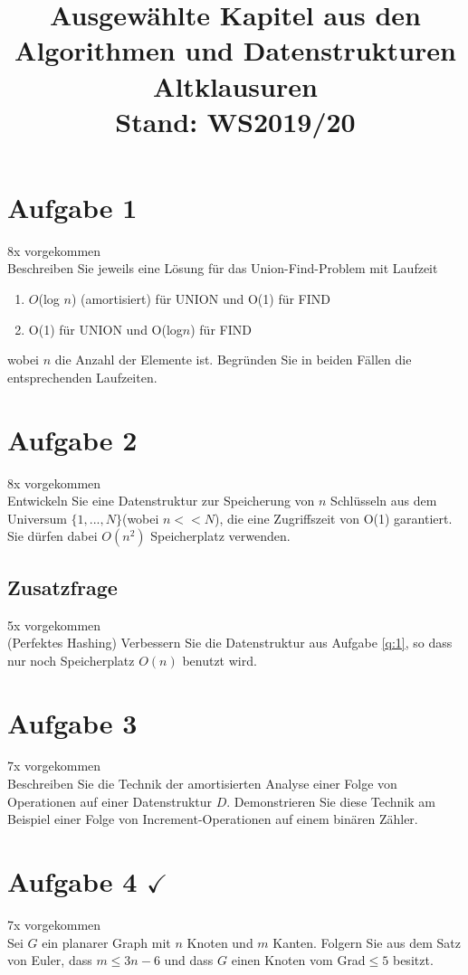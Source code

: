 \documentclass[10pt,a4paper]{article}
\author{}
\date{}
\title{{\Huge \textbf{Ausgewählte Kapitel aus den Algorithmen und Datenstrukturen Altklausuren}} \\ Stand: WS2019/20}
\begin{document}
	\maketitle
	
\section*{Aufgabe 1} 
	8x vorgekommen \\
	Beschreiben Sie jeweils eine Lösung für das Union-Find-Problem mit Laufzeit
	\begin{enumerate}
		\item $O$(log $n$) (amortisiert) für UNION und O(1) für FIND
		\item O(1) für UNION und O(log$n$) für FIND
	\end{enumerate}	
	wobei $n$ die Anzahl der Elemente ist. Begründen Sie in beiden Fällen die entsprechenden Laufzeiten.
	
\section*{Aufgabe 2}\label{q:1} 
	8x vorgekommen \\
	Entwickeln Sie eine Datenstruktur zur Speicherung von $n$ Schlüsseln aus dem Universum $\{1,...,N\}$(wobei $n<<N$), die eine Zugriffszeit von O(1) garantiert. Sie dürfen dabei $O(n^2)$ Speicherplatz verwenden.
\subsection*{Zusatzfrage} 
	5x vorgekommen \\
	(Perfektes Hashing) Verbessern Sie die Datenstruktur aus Aufgabe \ref{q:1}, so dass nur noch Speicherplatz $O(n)$ benutzt wird.
	
\section*{Aufgabe 3} 
	7x vorgekommen \\
	Beschreiben Sie die Technik der amortisierten Analyse einer Folge von Operationen auf einer Datenstruktur $D$. Demonstrieren Sie diese Technik am Beispiel einer Folge von Increment-Operationen auf einem binären Zähler.
	
\section*{Aufgabe 4 $\checkmark$}\label{q:2}
	7x vorgekommen \\
	Sei $G$ ein planarer Graph mit $n$ Knoten und $m$ Kanten. Folgern Sie aus dem Satz von Euler, dass $m\leq3n-6$ und dass $G$ einen Knoten vom Grad$\leq5$ besitzt.
\end{document}
